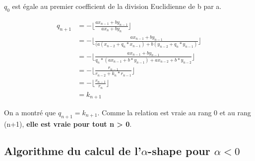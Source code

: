 $q_0$ est égale au premier coefficient de la division Euclidienne de b par a.

\begin{align*}
q_{n+1} &= - \lfloor\frac{a x_{n-1} + b y_{n-1}}{ a x_{n} + b y_{n}}\rfloor \\
        &= - \lfloor\frac{a x_{n-1} + b y_{n-1}}{ (a (x_{n-2} + q_n * x_{n-1}) + b (y_{n-2} + q_n * y_{n-1})}\rfloor \\
        &= - \lfloor\frac{a x_{n-1} + b y_{n-1}}{ q_n*(a x_{n-1} + b*y_{n-1} ) + a x_{n-2} + b*y_{n-2}  }\rfloor \\
        &= - \lfloor\frac{r_{n-1}              }{ r_{n-2} + k_n * r_{n-1}}\rfloor \\
        &= - \lfloor\frac{r_{n-1}              }{ r_{n} }\rfloor \\
        &= k_{n+1}
\end{align*}

On a montré que \textbf{$q_{n+1}= k_{n+1}$}. Comme la relation est vraie au rang 0 et au rang (n+1),  \textbf{elle est vraie pour tout n > 0}.


\subsection{Algorithme du calcul de l'$\alpha$-shape pour $\alpha <0$}



